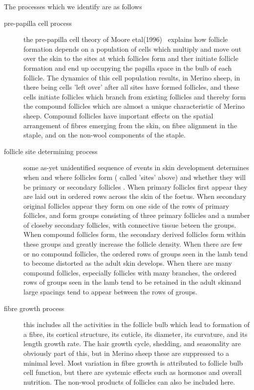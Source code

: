 \documentclass[titlepage]{article}  %
\begin{document}
The processes which we identify are as follows
\begin{description}
\item[pre-papilla cell process] the pre-papilla cell theory of Moore etal(1996)~\cite{moor:96} explains how follicle formation depends on a population of cells which multiply and move out over the skin to the sites at which follicles form and ther initiate follicle formation and end up occupying the papilla space in the bulb of each follicle. The dynamics of this cell population results, in Merino sheep, in there being cells 'left over' after all sites have formed follicles, and these cells initiate follicles which branch from existing follicles and thereby form the compound follicles which are almost a unique characteristic of Merino sheep. Compound follicles have important effects on the spatial arrangement of fibres emerging from the skin, on fibre alignment in the staple, and on the non-wool components of the staple.
\item[follicle site determining process] some as-yet unidentified sequence of events in skin development determines when and where follicles form ( called 'sites' above) and whether they will be primary or secondary follicles . When primary follicles first appear they are laid out in ordered rows across the skin of the foetus. When secondary original follicles appear they form on one side of the rows of primary follicles, and form groups consisting of three primary follicles and a number of closeby secondary follicles, with connective tissue beteen the groups.  When compound follicles form, the secondary derived follicles form within these groups and greatly increase the follicle density. When there are few or no compound follicles, the ordered rows of groups seen in the lamb tend to become distorted as the adult skin develops. When there are many compound follicles, especially follicles with many branches, the ordered rows of groups seen in the lamb tend to be retained in the adult skinand large spacings tend to appear between the rows of groups.
\item[fibre growth process] this includes all the activities in the follicle bulb which lead to formation of a fibre, its cortical structure, its cuticle, its diameter, its curvature, and its length growth rate. The hair growth cycle, shedding, and seasonality are obviously part of this, but in Merino sheep these are suppressed to a minimal level. Most variation in fibre growth is attributed to follicle bulb cell function, but there are systemic effects such as hormones and overall nutrition. The non-wool products of follicles can also be included here.
\end{description}
\end{document}
